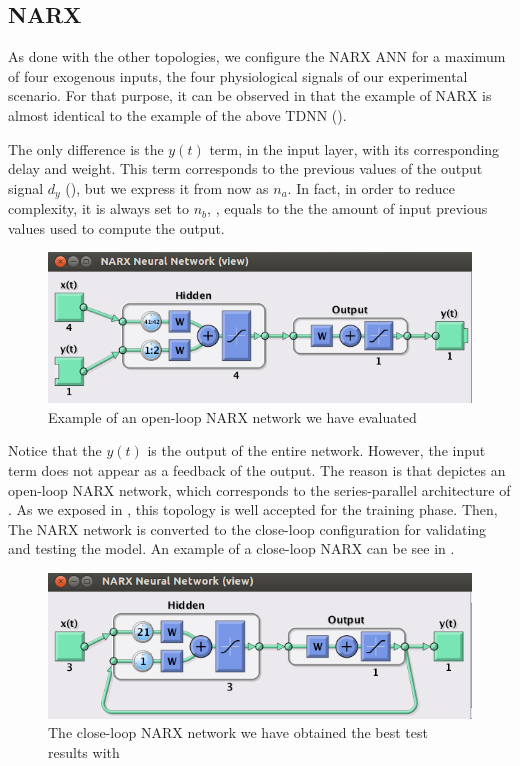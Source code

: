 \subsection{NARX}
\label{subsec:narxapplication}

As done with the other topologies, we configure the NARX ANN for a maximum of four exogenous inputs, the four physiological signals of our experimental scenario. 
For that purpose, it can be observed in  that the example of NARX is almost identical to the example of the above TDNN (). 

The only difference is the $y(t)$ term, in the input layer, with its corresponding delay and weight. This term corresponds to the previous values of the output signal $d_{y}$ (), but we express it from now as $n_{a}$.  In fact, in order to reduce complexity, it is always set to $n_{b}$, \ie, equals to the the amount of input previous values used to compute the output.


\begin{figure}[!ht]
\centering
\includegraphics[width=0.9\columnwidth]{images/results/narxOpenloop}
\caption{Example of an open-loop NARX network we have evaluated}
\label{fig:narxopenloop}
\end{figure}

Notice that the $y(t)$ is the output of the entire network. 
However, the input term does not appear as a feedback of the output. 
The reason is that  depictes an open-loop NARX network, which corresponds to the series-parallel architecture of . 
As we exposed in , this topology is well accepted for the training phase. 
Then, 
The NARX network is converted to the close-loop configuration for validating and 
testing the model. An example of a close-loop NARX can be see in .
\begin{figure}[!ht]
\centering
\includegraphics[width=0.9\columnwidth]{images/results/narxCloseloop}
\caption{The close-loop NARX network we have obtained the best test results with}
\label{fig:narxcloseloop}
\end{figure}

